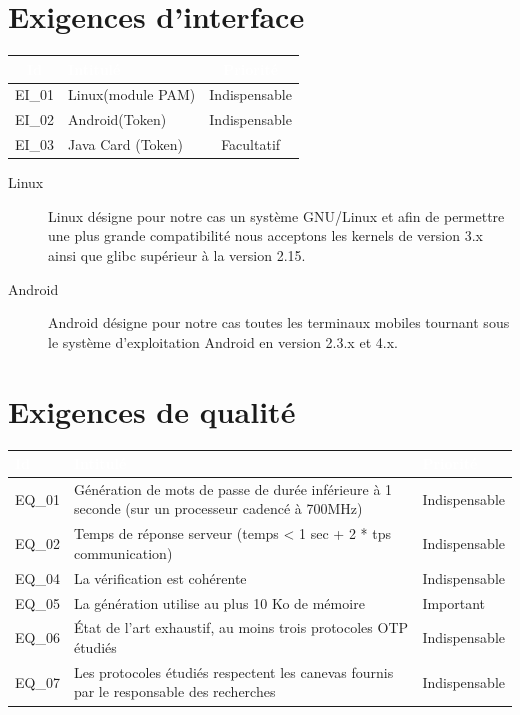 \documentclass{"../../res/univ-projet"}
\begin{document}
\section{Exigences d'interface}
\begin{tabular}{|c|l|c|}
    \hline
    \rowcolor{gray}
    \textcolor{white}{Id} & \textcolor{white}{Intitulé} & \textcolor{white}{Priorité}\\
    \hline
    EI\_01 & Linux(module PAM) & Indispensable\\
    \hline
    EI\_02 & Android(Token) & Indispensable\\
    \hline
    EI\_03 & Java Card (Token) & Facultatif\\
    \hline
\end{tabular}
\vspace{0.5cm}
\begin{description}
 \item[Linux] Linux désigne pour notre cas un système GNU/Linux et afin de permettre une plus grande compatibilité
 nous acceptons les kernels de version 3.x ainsi que glibc supérieur à la version 2.15.
 \item[Android] Android désigne pour notre cas toutes les terminaux mobiles tournant sous le système d'exploitation Android en version 2.3.x et 4.x.
\end{description}

\section{Exigences de qualité}
\begin{tabular}{|p{}|p{}|p{}|}
    \hline
    \rowcolor{gray}
    \textcolor{white}{Id} & \textcolor{white}{Intitulé} & \textcolor{white}{Priorité}\\
    \hline
    EQ\_01 & Génération de mots de passe de durée inférieure à 1 seconde (sur un processeur cadencé à 700MHz) & Indispensable\\
    \hline
    EQ\_02 & Temps de réponse serveur (temps < 1 sec + 2 * tps communication) & Indispensable\\
    \hline
    EQ\_04 & La vérification est cohérente & Indispensable\\
    \hline
    EQ\_05 & La génération utilise au plus 10 Ko de mémoire & Important\\
    \hline
    EQ\_06 & État de l'art exhaustif, au moins trois protocoles OTP étudiés & Indispensable\\
    \hline
    EQ\_07 & Les protocoles étudiés respectent les canevas fournis par le responsable des recherches & Indispensable\\
    \hline
\end{tabular}
\end{document}
